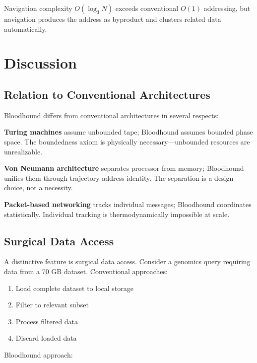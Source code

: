 \documentclass[10pt,twocolumn]{article}
\theoremstyle{definition}
\theoremstyle{remark}
\begin{document}
Navigation complexity $O(\log_3 N)$ exceeds conventional $O(1)$ addressing, but navigation produces the address as byproduct and clusters related data automatically.

\section{Discussion}
\label{sec:discussion}

\subsection{Relation to Conventional Architectures}

Bloodhound differs from conventional architectures in several respects:

\textbf{Turing machines} \cite{turing1936,sipser2012} assume unbounded tape; Bloodhound assumes bounded phase space. The boundedness axiom is physically necessary---unbounded resources are unrealizable.

\textbf{Von Neumann architecture} \cite{vonneumann1945,vonneumann1958} separates processor from memory; Bloodhound unifies them through trajectory-address identity. The separation is a design choice, not a necessity.

\textbf{Packet-based networking} \cite{lamport1978,fischer1985} tracks individual messages; Bloodhound coordinates statistically. Individual tracking is thermodynamically impossible at scale.

\subsection{Surgical Data Access}

A distinctive feature is surgical data access. Consider a genomics query requiring data from a 70 GB dataset. Conventional approaches:

\begin{enumerate}[nosep]
\item Load complete dataset to local storage
\item Filter to relevant subset
\item Process filtered data
\item Discard loaded data
\end{enumerate}

Bloodhound approach:
\end{document}
